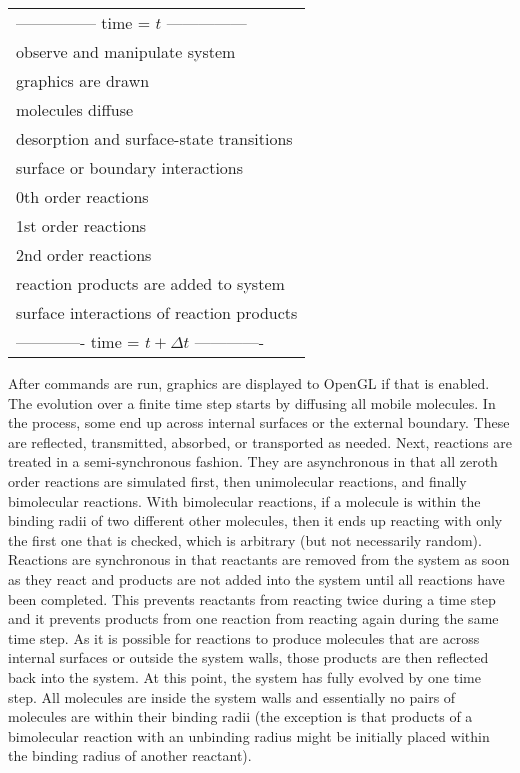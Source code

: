 \documentclass {scrbook}
\begin{document}
\begin{longtable}[c]{l}
--------------- time = $t$ ---------------\\
observe and manipulate system\\
graphics are drawn\\
molecules diffuse\\
desorption and surface-state transitions\\
surface or boundary interactions\\
0th order reactions\\
1st order reactions\\
2nd order reactions\\
reaction products are added to system\\
surface interactions of reaction products\\
------------- time = $t + \Delta t$ -------------
\end{longtable}

After commands are run, graphics are displayed to OpenGL if that is enabled. The evolution over a finite time step starts by diffusing all mobile molecules. In the process, some end up across internal surfaces or the external boundary. These are reflected, transmitted, absorbed, or transported as needed. Next, reactions are treated in a semi-synchronous fashion. They are asynchronous in that all zeroth order reactions are simulated first, then unimolecular reactions, and finally bimolecular reactions. With bimolecular reactions, if a molecule is within the binding radii of two different other molecules, then it ends up reacting with only the first one that is checked, which is arbitrary (but not necessarily random). Reactions are synchronous in that reactants are removed from the system as soon as they react and products are not added into the system until all reactions have been completed. This prevents reactants from reacting twice during a time step and it prevents products from one reaction from reacting again during the same time step. As it is possible for reactions to produce molecules that are across internal surfaces or outside the system walls, those products are then reflected back into the system. At this point, the system has fully evolved by one time step. All molecules are inside the system walls and essentially no pairs of molecules are within their binding radii (the exception is that products of a bimolecular reaction with an unbinding radius might be initially placed within the binding radius of another reactant).
\end{document}
